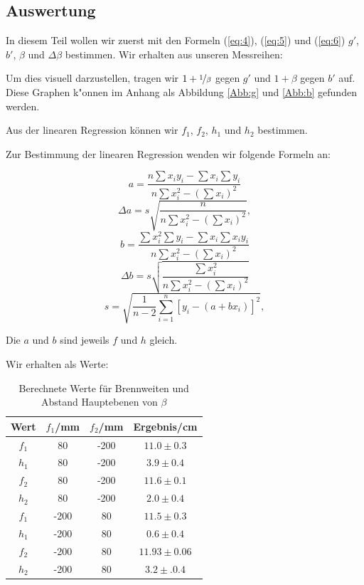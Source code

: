 \documentclass[11pt,a4paper]{article}
\begin{document}
\pagebreak

\subsection{Auswertung}

In diesem Teil wollen wir zuerst mit den Formeln (\ref{eq:4}), (\ref{eq:5}) und (\ref{eq:6}) $g'$, $b'$, $\beta$ und $\Delta \beta$ bestimmen. Wir erhalten aus unseren Messreihen:

Um dies visuell darzustellen, tragen wir $1+\nicefrac{1}{\beta}$ gegen $g'$ und $1+\beta$ gegen $b'$ auf. Diese Graphen k"onnen im Anhang als Abbildung \ref{Abb:g} und \ref{Abb:b} gefunden werden.

Aus der linearen Regression k\"onnen wir $f_1$, $f_2$, $h_1$ und $h_2$ bestimmen. 

Zur Bestimmung der linearen Regression wenden wir folgende Formeln an:

\begin{equation}
a=\frac{n\sum x_iy_i-\sum x_i\sum y_i}{n\sum x_i^2-(\sum x_i)^2}
\end{equation}
\begin{equation}
\Delta a=s\sqrt{\frac{n}{n\sum x_i^2-(\sum x_i)^2}},
\end{equation}
\begin{equation}
b=\frac{\sum x_i^2\sum y_i-\sum x_i\sum x_iy_i}{n\sum x_i^2-(\sum x_i)^2}
\end{equation}
\begin{equation}
\Delta b=s\sqrt{\frac{\sum x_i^2}{n\sum x_i^2-(\sum x_i)^2}}
\end{equation}
\begin{equation}
s=\sqrt{\frac{1}{n-2}\sum^n_{i=1}[y_i-(a+bx_i)]^2},
\end{equation}

Die $a$ und $b$ sind jeweils $f$ und $h$ gleich.

Wir erhalten als Werte:

\begin{table}[h]
\centering
\caption{Berechnete Werte f\"ur Brennweiten und Abstand Hauptebenen von $\beta$} \vspace{11pt}
\begin{tabular}{cccc}
\toprule
\textrm{Wert} & $f_1$/\textrm{mm} & $f_2$/\textrm{mm} & \textrm{Ergebnis}/\textrm{cm} \\
\midrule 
$f_1$ & 80 & -200 & $11.0\pm0.3$\\
$h_1$ & 80 & -200 & $3.9\pm0.4$\\
$f_2$ & 80 & -200 & $11.6\pm0.1$\\
$h_2$ & 80 & -200 & $2.0\pm0.4$\\
$f_1$ & -200 & 80 & $11.5\pm0.3$\\
$h_1$ & -200 & 80 & $0.6\pm0.4$\\
$f_2$ & -200 & 80 & $11.93\pm0.06$\\
$h_2$ & -200 & 80 & $3.2\pm.0.4$\\
\bottomrule
\end{tabular}
\label{Tab:1}
\end{table}
\end{document}
